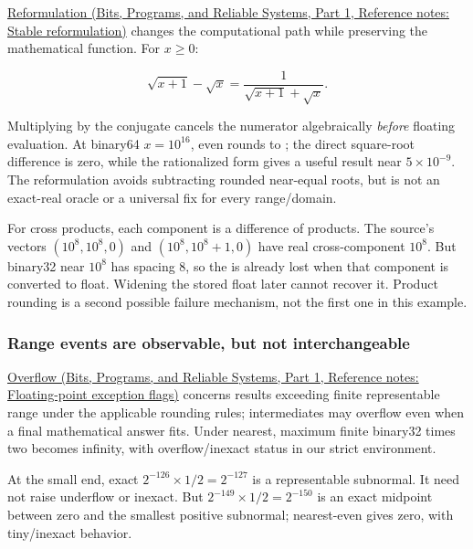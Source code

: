 \href{../01-Bits-Programs-and-Reliable-Systems-P01/main.pdf\#nameddest=appendix-d7f8ba961670}{Reformulation (Bits, Programs, and Reliable Systems, Part 1, Reference notes: Stable reformulation)} changes the computational path while preserving the mathematical function. For \(x\ge0\):

\[
\sqrt{x+1}-\sqrt{x}
=\frac{1}{\sqrt{x+1}+\sqrt{x}}.
\]

Multiplying by the conjugate cancels the numerator algebraically \emph{before} floating evaluation. At binary64 \(x=10^{16}\), even  rounds to ; the direct square-root difference is zero, while the rationalized form gives a useful result near \(5\times10^{-9}\). The reformulation avoids subtracting rounded near-equal roots, but is not an exact-real oracle or a universal fix for every range/domain.

For cross products, each component is a difference of products. The source's vectors \((10^8,10^8,0)\) and \((10^8,10^8+1,0)\) have real cross-component \(10^8\). But binary32 near \(10^8\) has spacing 8, so the  is already lost when that component is converted to float. Widening the stored float later cannot recover it. Product rounding is a second possible failure mechanism, not the first one in this example.

\subsubsection{Range events are observable, but not interchangeable}\label{05-engine-i-ch001-range-events-are-observable-but-not-interchangeable}

\hypertarget{05-engine-i-ch001-range-events-are-observable-but-not-interchangeable}{}

\href{../01-Bits-Programs-and-Reliable-Systems-P01/main.pdf\#nameddest=appendix-ed8531b46754}{Overflow (Bits, Programs, and Reliable Systems, Part 1, Reference notes: Floating-point exception flags)} concerns results exceeding finite representable range under the applicable rounding rules; intermediates may overflow even when a final mathematical answer fits. Under nearest, maximum finite binary32 times two becomes infinity, with overflow/inexact status in our strict environment.

At the small end, exact \(2^{-126}\times1/2=2^{-127}\) is a representable subnormal. It need not raise underflow or inexact. But \(2^{-149}\times1/2=2^{-150}\) is an exact midpoint between zero and the smallest positive subnormal; nearest-even gives zero, with tiny/inexact behavior.

